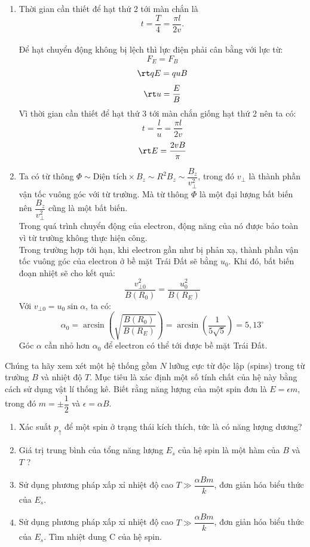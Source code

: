 \begin{loigiai}
\begin{enumerate}[1)]
\begin{center}
\begin{tikzpicture}[x=0.75pt,y=0.75pt,yscale=-1,xscale=1]
        
        \end{tikzpicture}
    \end{center}
    \item Thời gian cần thiết để hạt thứ 2 tới màn chắn là \[t=\dfrac{T}{4}=\dfrac{\pi l}{2v}.\]
    \\Để hạt chuyển động không bị lệch thì lực điện phải cân bằng với lực từ:
    $$F_E=F_B$$
    $$\rt qE=quB$$
    $$\rt u=\dfrac{E}{B}$$
    Vì thời gian cần thiết để hạt thứ 3 tới màn chắn giống hạt thứ 2 nên ta có: 
    $$t=\dfrac{l}{u}=\dfrac{\pi l}{2v}$$
    $$\rt E=\dfrac{2vB}{\pi}$$
    \item Ta có từ thông $\Phi \sim \text{Diện tích} \times B_z \sim R^2 B_z \sim \dfrac{B_z}{v_ \bot ^2} $, trong đó $v_\bot$ là thành phần vận tốc vuông góc với từ trường. Mà từ thông $\Phi$ là một đại lượng bất biến nên $\dfrac{B_z}{v_ \bot ^2}$ cũng là một bất biến.
    \\Trong quá trình chuyển động của electron, động năng của nó được bảo toàn vì từ trường không thực hiện công.
    \\Trong trường hợp tới hạn, khi electron gần như bị phản xạ, thành phần vận tốc vuông góc của electron ở bề mặt Trái Đất sẽ bằng $u_0$. Khi đó, bất biến đoạn nhiệt sẽ cho kết quả:
    \[\dfrac{{v_{ \bot 0}^2}}{{B\left( {{R_0}} \right)}} = \dfrac{{u_0^2}}{{B\left( {{R_E}} \right)}}\]
    Với ${v_{ \bot 0}} = {u_0}\sin \alpha$, ta có:
    \[{\alpha _0} = \arcsin \left( {\sqrt {\dfrac{{B\left( {{R_0}} \right)}}{{B\left( {{R_E}} \right)}}} } \right) = \arcsin \left( {\dfrac{1}{{5\sqrt 5 }}} \right) = 5,13^\circ \]
    Góc $\alpha$ cần nhỏ hơn $\alpha_0$ để electron có thể tới được bề mặt Trái Đất.
\end{enumerate}
\end{loigiai}

\begin{vd}[Hệ spin]
    Chúng ta hãy xem xét một hệ thống gồm $N$ lưỡng cực từ độc lập (spins) trong từ trường $B$ và nhiệt độ $T$. Mục tiêu là xác định một số tính chất của hệ này bằng cách sử dụng vật lí thống kê. Biết rằng năng lượng của một spin đơn là $E=\epsilon m$, trong đó $m=\pm \dfrac{1}{2}$ và $\epsilon=\alpha B$.
    \begin{enumerate}[1)]
        \item Xác suất $p_\uparrow$ để một spin ở trạng thái kích thích, tức là có năng lượng dương?
        \item Giá trị trung bình của tổng năng lượng $E_s$ của hệ spin là một hàm của $B$ và $T$ ?
        \item  Sử dụng phương pháp xấp xỉ nhiệt độ cao $T \gg \dfrac{\alpha Bm}{k}$, đơn giản hóa biểu thức của $E_s$.
        \item Sử dụng phương pháp xấp xỉ nhiệt độ cao $T \gg \dfrac{\alpha Bm}{k}$, đơn giản hóa biểu thức của $E_s$. Tìm nhiệt dung C của hệ spin.
    \end{enumerate}
\end{vd}

